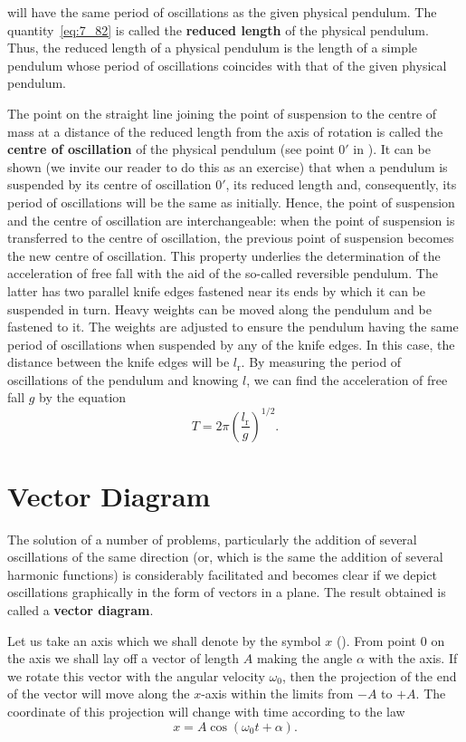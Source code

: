 \noindent
will have the same period of oscillations as the given physical pendulum. The quantity~\eqref{eq:7_82} is called the \textbf{reduced length} of the physical pendulum. Thus, the reduced length of a physical pendulum is the length of a simple pendulum whose period of oscillations coincides with that of the given physical pendulum.

The point on the straight line joining the point of suspension to the centre of mass at a distance of the reduced length from the axis of rotation is called the \textbf{centre of oscillation} of the physical pendulum (see point $0'$ in ). It can be shown (we invite our reader to do this as an exercise) that when a pendulum is suspended by its centre of oscillation $0'$, its reduced length and, consequently, its period of oscillations will be the same as initially. Hence, the point of suspension and the centre of oscillation are interchangeable: when the point of suspension is transferred to the centre of oscillation, the previous point of suspension becomes the new centre of oscillation. This property underlies the determination of the acceleration of free fall with the aid of the so-called reversible pendulum. The latter has two parallel knife edges fastened near its ends by which it can be suspended in turn. Heavy weights can be moved along the pendulum and be fastened to it. The weights are adjusted to ensure the pendulum having the same period of oscillations when suspended by any of the knife edges. In this case, the distance between the knife edges will be $l_{\text{r}}$. By measuring the period of oscillations of the pendulum and knowing $l$, we can find the acceleration of free fall $g$ by the equation
\begin{equation*}
	T = 2\pi\left(\frac{l_{\text{r}}}{g}\right)^{1/2}.
\end{equation*}

\section{Vector Diagram}\label{sec:7_7}

The solution of a number of problems, particularly the addition of several oscillations of the same direction (or, which is the same the addition of several harmonic functions) is considerably facilitated and becomes clear if we depict oscillations graphically in the form of vectors in a plane. The result obtained is called a \textbf{vector diagram}.

Let us take an axis which we shall denote by the symbol $x$ (). From point $0$ on the axis we shall lay off a vector of length $A$ making the angle $\alpha$ with the axis. If we rotate this vector with the angular velocity $\omega_0$, then the projection of the end of the vector will move along the $x$-axis within the limits from $-A$ to $+A$. The coordinate of this projection will change with time according to the law
\begin{equation*}
	x = A\cos(\omega_0 t + \alpha).
\end{equation*}

